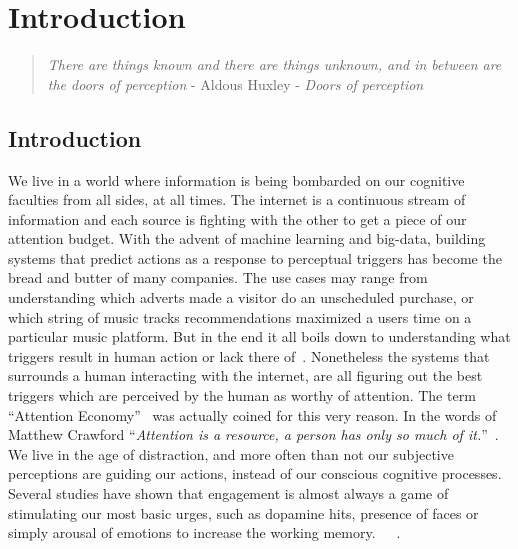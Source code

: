 
\chapter{Introduction}  %
\label{chap:Intro}

\graphicspath{{Chapter1/Figures/} {Chapter1/Figures}}
\begin{quote}
\textsl{There are things known and there are things unknown, and in between are the doors of perception} - Aldous Huxley - \textsl{Doors of perception}
\end{quote}


\section{Introduction}

We live in a world where information is being bombarded on our cognitive faculties from all sides, at all times. The internet is a continuous stream of information and each source is fighting with the other to get a piece of our attention budget. 
With the advent of machine learning and big-data, building systems that predict actions as a response to perceptual triggers has become the bread and butter of many companies. The use cases may range from understanding which adverts made a visitor do an unscheduled purchase, or which string of music tracks recommendations maximized a users time on a particular music platform. But in the end it all boils down to understanding what triggers result in human action or lack there of~\cite{song2012survey}. Nonetheless the systems that surrounds a human interacting with the internet, are all figuring out the best triggers which are perceived by the human as worthy of attention. 
The term ``Attention Economy''~\cite{davenport2001attention} was actually coined for this very reason. In the words of Matthew Crawford ``\textit{Attention is a resource, a person has only so much of it.}''~\cite{MatthewCrawford}. We live in the age of distraction, and more often than not our subjective perceptions are guiding our actions, instead of our conscious cognitive processes. Several studies have shown that engagement is almost always a game of stimulating our most basic urges, such as dopamine hits, presence of faces or simply arousal of emotions to increase the working memory.~\cite{bakhshi2014faces,joglekar2017like}~\cite{schupp2006emotion}~\cite{soat2015social}. 

